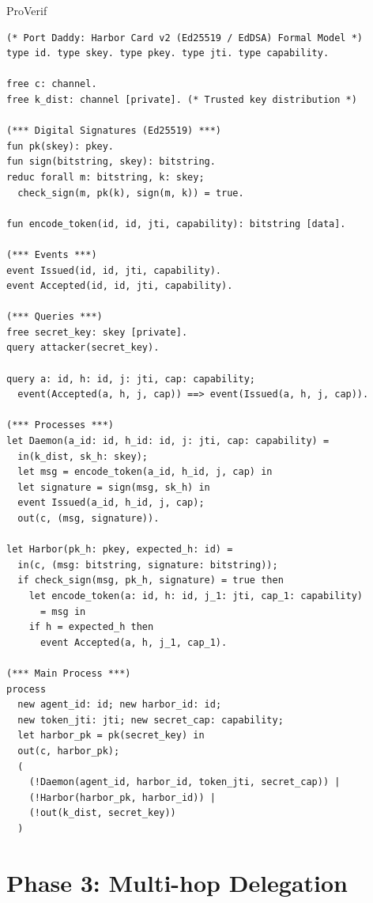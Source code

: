 \documentclass[11pt,a4paper]{article}
\theoremstyle{definition}
\begin{document}
\begin{pdlisting}{ProVerif}{}
\begin{lstlisting}[caption={\texttt{harbor\_card\_v2\_asymmetric.pv} (verified in ProVerif 2.05)}]
(* Port Daddy: Harbor Card v2 (Ed25519 / EdDSA) Formal Model *)
type id. type skey. type pkey. type jti. type capability.

free c: channel.
free k_dist: channel [private]. (* Trusted key distribution *)

(*** Digital Signatures (Ed25519) ***)
fun pk(skey): pkey.
fun sign(bitstring, skey): bitstring.
reduc forall m: bitstring, k: skey;
  check_sign(m, pk(k), sign(m, k)) = true.

fun encode_token(id, id, jti, capability): bitstring [data].

(*** Events ***)
event Issued(id, id, jti, capability).
event Accepted(id, id, jti, capability).

(*** Queries ***)
free secret_key: skey [private].
query attacker(secret_key).

query a: id, h: id, j: jti, cap: capability;
  event(Accepted(a, h, j, cap)) ==> event(Issued(a, h, j, cap)).

(*** Processes ***)
let Daemon(a_id: id, h_id: id, j: jti, cap: capability) =
  in(k_dist, sk_h: skey);
  let msg = encode_token(a_id, h_id, j, cap) in
  let signature = sign(msg, sk_h) in
  event Issued(a_id, h_id, j, cap);
  out(c, (msg, signature)).

let Harbor(pk_h: pkey, expected_h: id) =
  in(c, (msg: bitstring, signature: bitstring));
  if check_sign(msg, pk_h, signature) = true then
    let encode_token(a: id, h: id, j_1: jti, cap_1: capability)
      = msg in
    if h = expected_h then
      event Accepted(a, h, j_1, cap_1).

(*** Main Process ***)
process
  new agent_id: id; new harbor_id: id;
  new token_jti: jti; new secret_cap: capability;
  let harbor_pk = pk(secret_key) in
  out(c, harbor_pk);
  (
    (!Daemon(agent_id, harbor_id, token_jti, secret_cap)) |
    (!Harbor(harbor_pk, harbor_id)) |
    (!out(k_dist, secret_key))
  )
\end{lstlisting}
\end{pdlisting}

\section{Phase 3: Multi-hop Delegation}\label{app:phase3}
\end{document}
